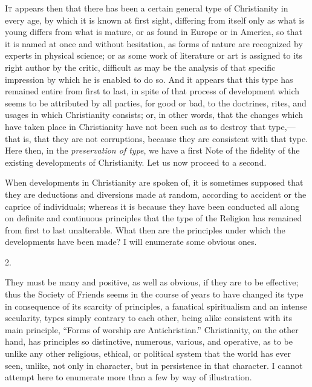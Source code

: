 
I\textsc{t} appears then that there has been a certain general type of
Christianity in every age, by which it is known at first sight,
differing from itself only as what is young differs from what is
mature, or as found in Europe or in America, so that it is named at
once and without hesitation, as forms of nature are recognized by
experts in physical science; or as some work of literature or art is
assigned to its right author by the critic, difficult as may be the
analysis of that specific impression by which he is enabled to do so.
And it appears that this type has remained entire from first to last,
in spite of that process of development which seems to be attributed
by all parties, for good or bad, to the doctrines, rites, and usages
in which Christianity consists; or, in other words, that the changes
which have taken place in Christianity have not been such as to
destroy that type,—that is, that they are not corruptions, because
they are consistent with that type. Here then, in the \emph{preservation
of type}, we have a first Note of the fidelity of the existing
developments of Christianity. Let us now proceed to a second.


When developments in Christianity are spoken of, it is sometimes
supposed that they are deductions and diversions made at random,
according to accident or the caprice of individuals; whereas it is
because they have been conducted all along on definite and continuous
principles that the type of the Religion has remained from first to
last unalterable. What then are the principles under which the
developments have been made? I will enumerate some obvious ones.

2.

They must be many and positive, as well as obvious, if they are to
be effective; thus the Society of Friends seems in the course of years
to have changed its type in consequence of its scarcity of principles,
a fanatical spiritualism and an intense secularity, types simply
contrary to each other, being alike consistent with its main
principle, ``Forms of worship are Antichristian.''
Christianity, on the other hand, has principles so distinctive,
numerous, various, and operative, as to be unlike any other religious,
ethical, or political system that the world has ever seen, unlike, not
only in character, but in persistence in that character. I cannot
attempt here to enumerate more than a few by way of illustration.

